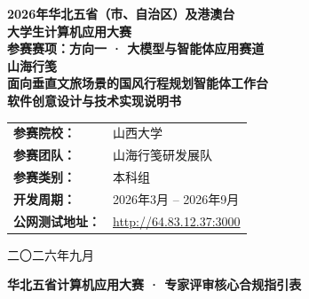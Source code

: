 \documentclass[11pt,a4paper,UTF8]{ctexart}
\begin{document}
\begin{titlepage}
    \centering
    \vspace*{1.5cm}
    
    {\Huge \bfseries 2026年华北五省（市、自治区）及港澳台\\[0.5em] 大学生计算机应用大赛}\\[1.5cm]
    
    {\Large \textbf{参赛赛项：方向一 · 大模型与智能体应用赛道}}\\[2cm]
    
    {\Huge \bfseries \color{inkred} 山海行笺}\\[0.8em]
    {\LARGE \textbf{面向垂直文旅场景的国风行程规划智能体工作台}}\\[0.5em]
    {\large \textbf{软件创意设计与技术实现说明书}}\\[3cm]
    
    \begin{tabular}{ll}
        \textbf{参赛院校：} & 山西大学 \\
        \textbf{参赛团队：} & 山海行笺研发展队 \\
        \textbf{参赛类别：} & 本科组 \\
        \textbf{开发周期：} & 2026年3月 -- 2026年9月 \\
        \textbf{公网测试地址：} & \url{http://64.83.12.37:3000} \\
    \end{tabular}
    
    \vfill
    {\large 二〇二六年九月}
\end{titlepage}

\newpage
\thispagestyle{empty}
\begin{center}
    {\Large \bfseries 华北五省计算机应用大赛 · 专家评审核心合规指引表}
\end{center}
\vspace{0.8em}
\end{document}
